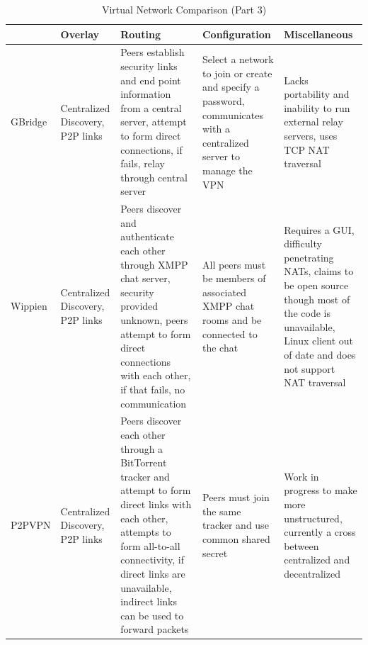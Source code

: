\begin{table}[ht]
\caption{Virtual Network Comparison (Part 3)}
\label{tab:virtual_networks_part3}
{\small
\centering
\begin{tabular}{|p{.8in}||p{1.25in}|p{1.25in}|p{1.25in}|p{1.25in}|} \hline
& Overlay & Routing & Configuration & Miscellaneous \\ \hline\hline
GBridge
&
Centralized Discovery, P2P links
&
Peers establish security links and end point information from a central
server, attempt to form direct connections, if fails, relay through central
server
&
Select a network to join or create and specify a password, communicates with a
centralized server to manage the VPN
&
Lacks portability and inability to run external relay servers, uses TCP NAT
traversal
\\ \hline
Wippien
&
Centralized Discovery, P2P links
&
Peers discover and authenticate each other through XMPP chat server, security
provided unknown, peers attempt to form direct connections with each other, if
that fails, no communication
&
All peers must be members of associated XMPP chat rooms and be connected to the
chat
&
Requires a GUI, difficulty penetrating NATs, claims to be open source though
most of the code is unavailable, Linux client out of date and does not support
NAT traversal
\\ \hline
P2PVPN
&
Centralized Discovery, P2P links
&
Peers discover each other through a BitTorrent tracker and attempt to form
direct links with each other, attempts to form all-to-all connectivity, if
direct links are unavailable, indirect links can be used to forward packets
&
Peers must join the same tracker and use common shared secret
&
Work in progress to make more unstructured, currently a cross between
centralized and decentralized
\\ \hline
\end{tabular}
}
\end{table}

